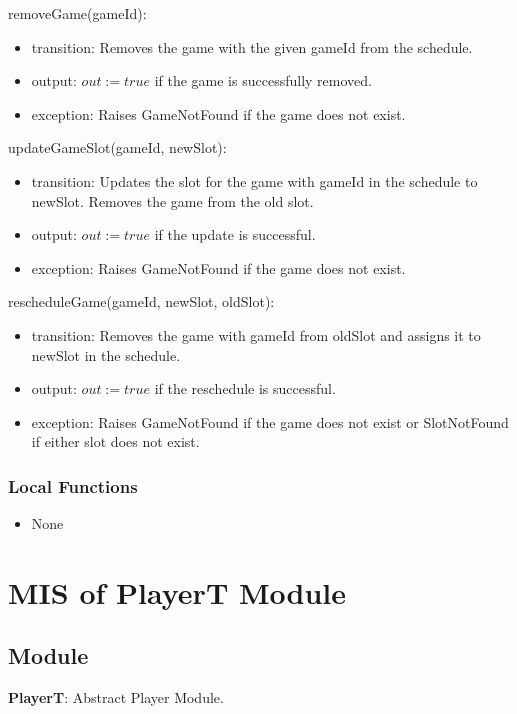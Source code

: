 \documentclass[12pt, titlepage]{article}
\begin{document}
\noindent removeGame(gameId):
\begin{itemize}
    \item transition: Removes the game with the given gameId from the schedule.
    \item output: $out := true$ if the game is successfully removed.
    \item exception: Raises GameNotFound if the game does not exist.
\end{itemize}

\noindent updateGameSlot(gameId, newSlot):
\begin{itemize}
    \item transition: Updates the slot for the game with gameId in the schedule to newSlot. Removes the game from the old slot.
    \item output: $out := true$ if the update is successful.
    \item exception: Raises GameNotFound if the game does not exist.
\end{itemize}

\noindent rescheduleGame(gameId, newSlot, oldSlot):
\begin{itemize}
    \item transition: Removes the game with gameId from oldSlot and assigns it to newSlot in the schedule.
    \item output: $out := true$ if the reschedule is successful.
    \item exception: Raises GameNotFound if the game does not exist or SlotNotFound if either slot does not exist.
\end{itemize}

\subsubsection{Local Functions}

\begin{itemize}
    \item None
\end{itemize}

\newpage

\section{MIS of PlayerT Module} \label{PlayerTModule}

\subsection{Module}
\textbf{PlayerT}: Abstract Player Module.
\end{document}
